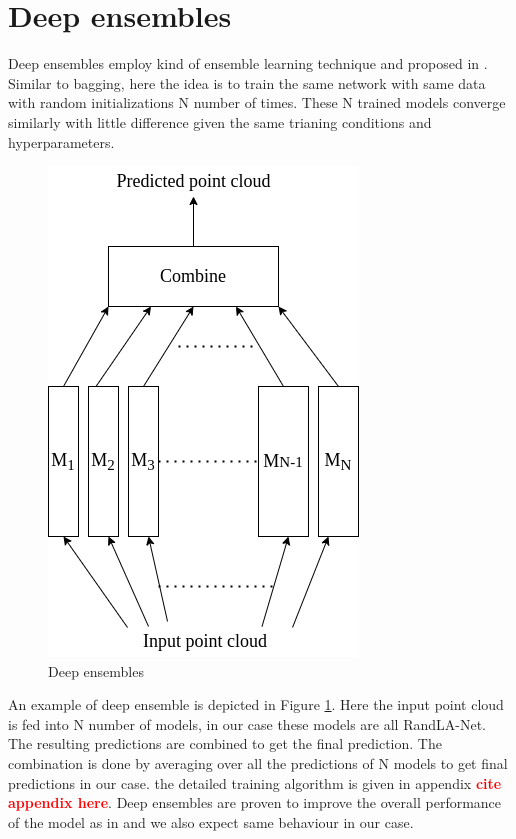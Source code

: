 \section{Deep ensembles}
\label{sec:meth_deepensembles}
Deep ensembles employ kind of ensemble learning technique and proposed in \cite{lakshminarayanan2016simple}.
Similar to bagging, here the idea is to train the same network with same data with random initializations N number of times.
These N trained models converge similarly with little difference given the same trianing conditions and hyperparameters.
\begin{figure}
    \centering
    \includegraphics[scale=0.5]{images/Ensembles.png}
    \caption{Deep ensembles}
    \label{fig:deepensembles}
\end{figure}
An example of deep ensemble is depicted in Figure \ref{fig:deepensembles}.
Here the input point cloud is fed into N number of models, in our case these models are all RandLA-Net.
The resulting predictions are combined to get the final prediction. 
The combination is done by averaging over all the predictions of N models to get final predictions in our case.
the detailed training algorithm is given in appendix \textcolor{red}{\textbf{cite appendix here}}.
Deep ensembles are proven to improve the overall performance of the model as in \cite{bhandary2020evaluating} and we also expect same behaviour in our case.

